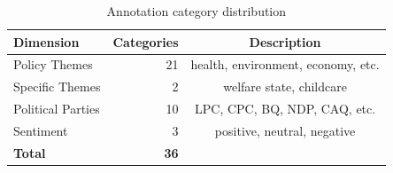 \begin{table}[h!]
\centering
\caption{Annotation category distribution}
\label{tab:categories}
\begin{tabular}{lrc}
\toprule
\textbf{Dimension} & \textbf{Categories} & \textbf{Description} \\
\midrule
Policy Themes & 21 & health, environment, economy, etc. \\
Specific Themes & 2 & welfare state, childcare \\
Political Parties & 10 & LPC, CPC, BQ, NDP, CAQ, etc. \\
Sentiment & 3 & positive, neutral, negative \\
\midrule
\textbf{Total} & \textbf{36} & \\
\bottomrule
\end{tabular}
\end{table}